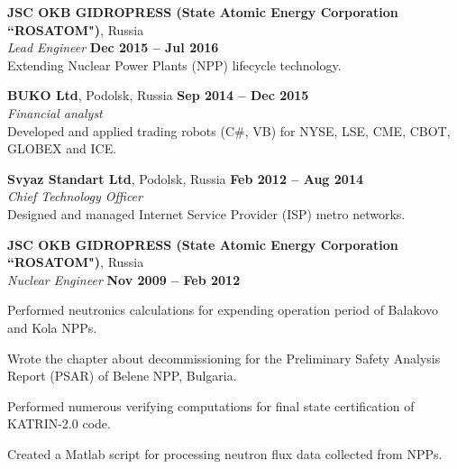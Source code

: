 \documentclass[margin,line]{resume}
\begin{document}
\begin{resume}
    \textbf{JSC OKB GIDROPRESS (State Atomic Energy Corporation ``ROSATOM")}, Russia \\
		\textsl{Lead Engineer} \hfill \textbf{Dec 2015 -- Jul 2016}\\
                Extending Nuclear Power Plants (NPP) lifecycle technology.

    \textbf{BUKO Ltd}, Podolsk, Russia \hfill \textbf{Sep 2014 -- Dec 2015}\\
		\textsl{Financial analyst}\\
		Developed and applied trading robots (C\#, VB) for NYSE, LSE, CME, CBOT, GLOBEX and ICE.

    \textbf{Svyaz Standart Ltd}, Podolsk, Russia \hfill \textbf{Feb 2012 -- Aug 2014}\\
		\textsl{Chief Technology Officer}\\
		Designed and managed Internet Service Provider (ISP) metro networks.

    \textbf{JSC OKB GIDROPRESS (State Atomic Energy Corporation ``ROSATOM")}, Russia \\
		\textsl{Nuclear Engineer} \hfill \textbf{Nov 2009 -- Feb 2012}\\
                \vspace{-4mm}\begin{list2}
				\item Performed neutronics calculations for expending operation period of Balakovo and Kola NPPs.
				\item Wrote the chapter about decommissioning for the Preliminary Safety Analysis Report (PSAR) of Belene NPP, Bulgaria.
				\item Performed numerous verifying computations for final state certification of KATRIN-2.0 code.
				\item Created a Matlab script for processing neutron flux data collected from NPPs.
                \end{list2}


\end{resume}
\end{document}
